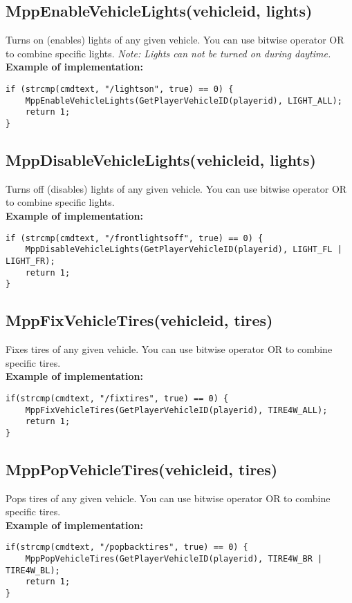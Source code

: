 \documentclass{article}
\begin{document}
\newpage
\subsection{MppEnableVehicleLights(vehicleid, lights)}
Turns on (enables) lights of any given vehicle. You can use bitwise operator OR to combine specific lights. \textit{Note: Lights can not be turned on during daytime.}
\bigskip
\\\textbf{Example of implementation:}
\begin{verbatim}
if (strcmp(cmdtext, "/lightson", true) == 0) {
    MppEnableVehicleLights(GetPlayerVehicleID(playerid), LIGHT_ALL);
    return 1;
}
\end{verbatim}

\subsection{MppDisableVehicleLights(vehicleid, lights)}
Turns off (disables) lights of any given vehicle. You can use bitwise operator OR to combine specific lights.
\bigskip
\\\textbf{Example of implementation:}
\begin{verbatim}
if (strcmp(cmdtext, "/frontlightsoff", true) == 0) {
    MppDisableVehicleLights(GetPlayerVehicleID(playerid), LIGHT_FL | LIGHT_FR);
    return 1;
}
\end{verbatim}

\subsection{MppFixVehicleTires(vehicleid, tires)}
Fixes tires of any given vehicle. You can use bitwise operator OR to combine specific tires.
\bigskip
\\\textbf{Example of implementation:}
\begin{verbatim}
if(strcmp(cmdtext, "/fixtires", true) == 0) {
    MppFixVehicleTires(GetPlayerVehicleID(playerid), TIRE4W_ALL);
    return 1;
}
\end{verbatim}

\subsection{MppPopVehicleTires(vehicleid, tires)}
Pops tires of any given vehicle. You can use bitwise operator OR to combine specific tires.
\bigskip
\\\textbf{Example of implementation:}
\begin{verbatim}
if(strcmp(cmdtext, "/popbacktires", true) == 0) {
    MppPopVehicleTires(GetPlayerVehicleID(playerid), TIRE4W_BR | TIRE4W_BL);
    return 1;
}
\end{verbatim}
\end{document}
